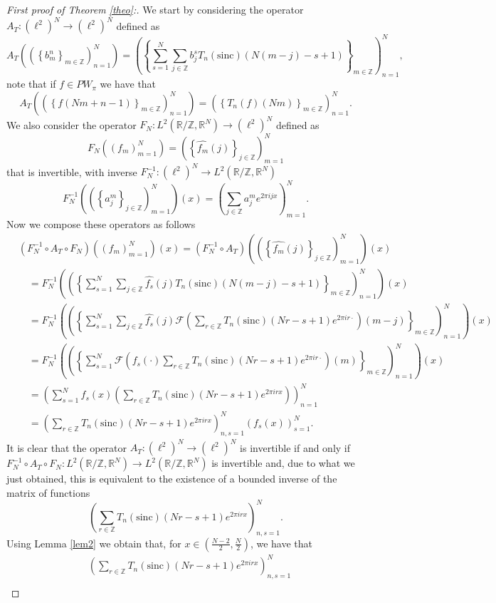 \documentclass[10pt,a4paper]{amsart}
\newcommand{\R}{{\mathbb R}}
\newcommand{\Z}{{\mathbb Z}}
\newcommand{\pa}[1]{\left(#1\right)}
\newcommand{\sinc}{\mathrm{sinc}}
\begin{document}
\begin{proof}[First proof of Theorem \ref{theo}:]
    We start by considering the operator $A_T: \pa{\ell^2}^N \to \pa{\ell^2}^N$ defined as
    $$A_T\pa{\pa{\left\{ b^n_m \right\}_{m\in\Z}}_{n=1}^N}
	=\pa{\left\{ \sum_{s=1}^N\sum_{j\in\Z} b_j^s T_n\pa{\sinc}(N(m-j)-s+1)\right\}_{m\in\Z}}_{n=1}^N,$$
	note that if $f\in PW_\pi$ we have that
	$$A_T\pa{\pa{\left\{ f(Nm+n-1) \right\}_{m\in\Z}}_{n=1}^N}
	=\pa{\left\{ T_n(f)(Nm)\right\}_{m\in\Z}}_{n=1}^N.$$
	We also consider the operator $F_N:L^2\pa{\R / \Z,\R^N}\to \pa{\ell^2}^N$ defined as
	$$F_N\pa{\pa{f_m}_{m=1}^N}=\pa{\left\{\widehat{f_m}(j)\right\}_{j\in\Z}}_{m=1}^N$$
	that is invertible, with inverse $F_N^{-1}:\pa{\ell^2}^N \to L^2\pa{\R / \Z,\R^N}$
	$$F_N^{-1}\pa{\pa{\left\{a^m_j\right\}_{j\in\Z}}_{m=1}^N}(x)=\pa{\sum_{j\in\Z} a^m_j e^{2\pi i j x}}_{m=1}^N.$$
	Now we compose these operators as follows
	\begin{align*}
		&\pa{F_N^{-1} \circ A_T \circ F_N}\pa{\pa{f_m}_{m=1}^N}(x)
		=\pa{F_N^{-1} \circ A_T }\pa{\pa{\left\{\widehat{f_m}(j)\right\}_{j\in\Z}}_{m=1}^N}(x) \\
		& \quad = F_N^{-1}\pa{\pa{\left\{ \sum_{s=1}^N\sum_{j\in\Z} \widehat{f_s}(j) 
		T_n\pa{\sinc}\pa{N(m-j)-s+1}\right\}_{m\in\Z}}_{n=1}^N}(x) \\
		& \quad = F_N^{-1}\pa{\pa{\left\{ \sum_{s=1}^N\sum_{j\in\Z} \widehat{f_s}(j) 
		\mathcal{F}\pa{\sum_{r\in\Z} T_n(\sinc)(Nr-s+1) e^{2\pi i r \cdot}}(m-j)\right\}_{m\in\Z}}_{n=1}^N}(x) \\
		& \quad = F_N^{-1}\pa{\pa{\left\{ \sum_{s=1}^N \mathcal{F}\pa{f_s(\cdot) 
		\sum_{r\in\Z} T_n(\sinc)(Nr-s+1) e^{2\pi i r \cdot}}(m)\right\}_{m\in\Z}}_{n=1}^N}(x) \\
		& \quad = \pa{\sum_{s=1}^N f_s(x) \pa{\sum_{r\in\Z} T_n(\sinc)(Nr-s+1) e^{2\pi i r x}}}_{n=1}^N \\
		& \quad =\pa{\sum_{r\in\Z} T_n(\sinc)(Nr-s+1) e^{2\pi i r x}}_{n,s=1}^N \pa{f_s(x)}_{s=1}^N.
	\end{align*}
	It is clear that the operator $A_T:\pa{\ell^2}^N\to\pa{\ell^2}^N$ is invertible if and only if 
	$F_N^{-1} \circ A_T \circ F_N:L^2\pa{\R / \Z,\R^N}\to L^2\pa{\R / \Z,\R^N}$ is invertible and, due 
	to what we just obtained, this is equivalent to the existence of a bounded inverse of the matrix of functions
	$$\pa{\sum_{r\in\Z} T_n(\sinc)(Nr-s+1) e^{2\pi i r x}}_{n,s=1}^N.$$
	Using Lemma \ref{lem2} we obtain that, for $x\in \pa{\frac{N-2}{2},\frac{N}{2}}$, we have that
	\begin{align*}
		&\pa{\sum_{r\in\Z} T_n(\sinc)(Nr-s+1) e^{2\pi i r x}}_{n,s=1}^N \\

\end{align*}
\end{proof}
\end{document}
